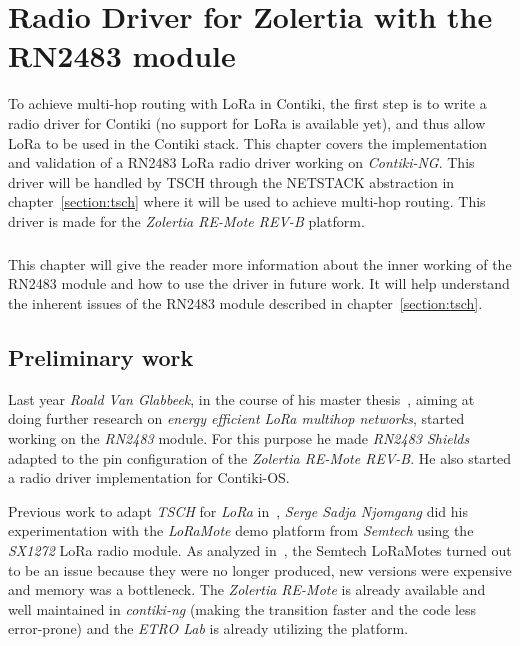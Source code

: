 \chapter{Radio Driver for Zolertia with the RN2483 module\label{section:radio}}

To achieve multi-hop routing with LoRa in Contiki, the first step is to write
a radio driver for Contiki (no support for LoRa is available yet),
and thus allow LoRa to be used in the Contiki stack.
This chapter covers the implementation and validation of a RN2483 LoRa radio
driver working on \emph{Contiki-NG}.
This driver will be handled by TSCH through the NETSTACK abstraction
in chapter~\ref{section:tsch} where it will be used to achieve multi-hop routing.
This driver is made for the \emph{Zolertia RE-Mote REV-B} platform.

\paragraph{}

This chapter will give the reader more information about the inner working of
the RN2483 module and how to use the driver in future work.
It will help understand the inherent issues of the RN2483 module
described in chapter~\ref{section:tsch}.

\section{Preliminary work}

Last year \emph{Roald Van Glabbeek}, in the course of his master thesis~\cite{8847137},
aiming at doing further research on \emph{energy efficient LoRa multihop networks},
started working on the \emph{RN2483} module.
For this purpose he made \emph{RN2483 Shields} adapted to the pin
configuration of the \emph{Zolertia RE-Mote REV-B}. He also started a radio driver
implementation for Contiki-OS\@.

Previous work to adapt \emph{TSCH} for \emph{LoRa}
in~\cite{njomgang_2018}, \emph{Serge Sadja Njomgang} did his experimentation with
the \emph{LoRaMote} demo platform from \emph{Semtech} using the \emph{SX1272} LoRa
radio module.
As analyzed in~\cite{8847137}, the Semtech LoRaMotes turned out to be an issue
because they were no longer produced, new versions were expensive and memory was
a bottleneck.
The \emph{Zolertia RE-Mote} is already available and well maintained
in \emph{contiki-ng} (making the transition faster and the code less error-prone)
and the \emph{ETRO Lab} is already utilizing the platform.


